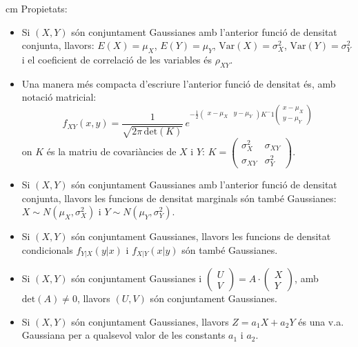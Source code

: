 \documentclass{article}
\begin{document}
 cm
Propietats:
\begin{itemize}
\item Si $(X, Y)$ s\'on conjuntament Gaussianes amb l'anterior funci\'o de densitat conjunta, 
llavors: $E(X)=\mu_X$, $E(Y)=\mu_Y$, $\mathrm{Var}(X)=\sigma_X^2$, $\mathrm{Var}(Y)=\sigma_Y^2$ i el
coeficient de correlaci\'o de les variables \'es $\rho_{XY}$.

\item Una manera m\'es compacta d'escriure l'anterior funci\'o de densitat \'es, amb notaci\'o matricial:
\[
f_{XY}(x, y)=\frac{1}{\sqrt{2 \pi \, \mathrm{det}(K)}} \, e^{-\frac{1}{2} 
\begin{pmatrix} x-\mu_X & y - \mu_Y \end{pmatrix} K^-1 \begin{pmatrix} x-\mu_X \\ y - \mu_Y \end{pmatrix}}
\]
\noindent
on $K$ \'es la matriu de covari\`ancies de $X$ i $Y$: 
$K=\begin{pmatrix} \sigma_X^2 & \sigma_{XY} \\ \sigma_{XY} & \sigma_Y^2 \end{pmatrix}$.

\item Si $(X, Y)$ s\'on conjuntament Gaussianes amb l'anterior funci\'o de densitat conjunta, llavors
les funcions de densitat marginals s\'on tamb\'e Gaussianes: 
$X\sim N(\mu_X, \sigma_X^2)$ i $Y \sim N(\mu_Y, \sigma_Y^2)$.

\item Si $(X, Y)$ s\'on conjuntament Gaussianes, llavors les funcions de densitat condicionals 
$f_{Y|X}(y|x)$ i $f_{X|Y}(x|y)$ s\'on tamb\'e Gaussianes.

\item Si $(X, Y)$ s\'on conjuntament Gaussianes i 
$\begin{pmatrix} U \\ V \end{pmatrix}=A \cdot \begin{pmatrix} X \\ Y \end{pmatrix}$, amb $\mathrm{det}(A)\neq 0$,
llavors $(U, V)$ s\'on conjuntament Gaussianes.

\item Si $(X, Y)$ s\'on conjuntament Gaussianes, llavors $Z=a_1 X+ a_2 Y$ \'es una v.a. Gaussiana per a 
qualsevol valor de les constants $a_1$ i $a_2$.

\end{itemize}
\end{document}
